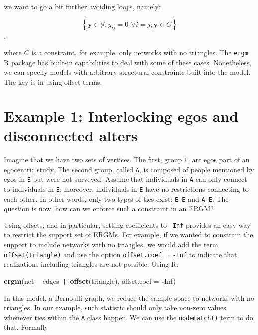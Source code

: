 \documentclass[]{book}
\newenvironment{Shaded}{\begin{snugshade}}{\end{snugshade}}
\newcommand{\DataTypeTok}[1]{\textcolor[rgb]{0.13,0.29,0.53}{#1}}
\newcommand{\KeywordTok}[1]{\textcolor[rgb]{0.13,0.29,0.53}{\textbf{#1}}}
\newcommand{\NormalTok}[1]{#1}
\newcommand{\OperatorTok}[1]{\textcolor[rgb]{0.81,0.36,0.00}{\textbf{#1}}}
\newcommand{\OtherTok}[1]{\textcolor[rgb]{0.56,0.35,0.01}{#1}}
\newcommand{\StringTok}[1]{\textcolor[rgb]{0.31,0.60,0.02}{#1}}
\begin{document}
\noindent we want to go a bit further avoiding loops, namely:

\[
\left\{\mathbf{y} \in \mathcal{Y}: y_{ij} = 0, \forall i = j; \mathbf{y} \in C\right\}
\],

\noindent where \(C\) is a constraint, for example, only networks with no triangles.
The \texttt{ergm} R package has built-in capabilities to deal with some of these
cases. Nonetheless, we can specify models with arbitrary
structural constraints built into the model. The key is in using offset terms.

\hypertarget{example-1-interlocking-egos-and-disconnected-alters}{%
\section{Example 1: Interlocking egos and disconnected alters}\label{example-1-interlocking-egos-and-disconnected-alters}}

Imagine that we have two sets of vertices. The first, group \texttt{E}, are egos part of
an egocentric study. The second group, called \texttt{A}, is composed of people mentioned by egos in \texttt{E} but
were not surveyed. Assume that individuals in \texttt{A} can only connect
to individuals in \texttt{E}; moreover, individuals in \texttt{E} have no restrictions connecting to each other.
In other words, only two types of ties exist: \texttt{E-E} and \texttt{A-E}. The question is
now, how can we enforce such a constraint in an ERGM?

Using offsets, and in particular, setting coefficients to \texttt{-Inf} provides
an easy way to restrict the support set of ERGMs. For example, if we wanted
to constrain the support to include networks with no triangles, we would
add the term \texttt{offset(triangle)} and use the option \texttt{offset.coef\ =\ -Inf} to
indicate that realizations including triangles are not possible. Using R:

\begin{Shaded}
\begin{Highlighting}[]
\KeywordTok{ergm}\NormalTok{(net }\OperatorTok{~}\StringTok{ }\NormalTok{edges }\OperatorTok{+}\StringTok{ }\KeywordTok{offset}\NormalTok{(triangle), }\DataTypeTok{offset.coef =} \OperatorTok{-}\OtherTok{Inf}\NormalTok{)}
\end{Highlighting}
\end{Shaded}

In this model, a Bernoulli graph, we reduce the sample space to networks
with no triangles. In our example, such statistic should only take non-zero
values whenever ties within the \texttt{A} class happen. We can use
the \texttt{nodematch()} term to do that. Formally
\end{document}
